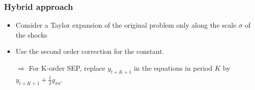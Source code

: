 \documentclass{beamer}
\begin{document}
\begin{frame}
   \frametitle{Hybrid approach}

   \begin{itemize}

      \item Consider a Taylor expansion of the original problem only along the scale $\sigma$ of the shocks\newline

      \item Use the second order correction for the constant.\newline

      \item[$\Rightarrow$] For K-order SEP, replace $y_{t+K+1}$ in the equations in period $K$ by $y_{t+K+1}+\frac{1}{2}g_{\sigma\sigma}$.\newline

   \end{itemize}

   \bigskip


\end{frame}
\end{document}
